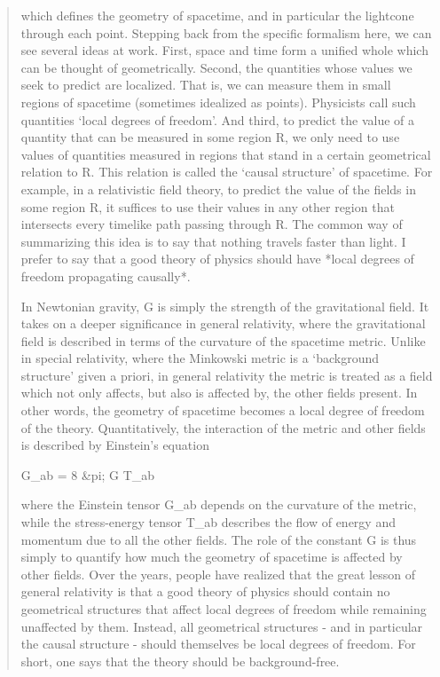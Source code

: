 \begin{quote}
which defines the geometry of spacetime, and in particular the lightcone
through each point.  Stepping back from the specific formalism here, we
can see several ideas at work.  First, space and time form a unified
whole which can be thought of geometrically.  Second, the quantities
whose values we seek to predict are localized.  That is, we can measure
them in small regions of spacetime (sometimes idealized as points).  
Physicists call such quantities `local degrees of freedom'.  And third,
to predict the value of a quantity that can be measured in some region
R, we only need to use values of quantities measured in regions that
stand in a certain geometrical relation to R.  This relation is called
the `causal structure' of spacetime.  For example, in a relativistic
field theory, to predict the value of the fields in some region R, it
suffices to use their values in any other region that intersects every
timelike path passing through R.  The common way of summarizing this
idea is to say that nothing travels faster than light.  I prefer to say
that a good theory of physics should have *local degrees of freedom
propagating causally*. 

In Newtonian gravity, G is simply the strength of the gravitational
field.  It takes on a deeper significance in general relativity, where
the gravitational field is described in terms of the curvature of the
spacetime metric.  Unlike in special relativity, where the Minkowski 
metric is a `background structure' given a priori, in general relativity
the metric is treated as a field which not only affects, but also is
affected by, the other fields present.  In other words, the geometry of
spacetime becomes a local degree of freedom of the theory.
Quantitatively, the interaction of the metric and other fields is
described by Einstein's equation

                 G_{ab} = 8 &pi; G T_{ab}

where the Einstein tensor G_{ab} depends on the curvature of the
metric, while the stress-energy tensor T_{ab} describes the flow
of energy and momentum due to all the other fields.  The role of the
constant G is thus simply to quantify how much the geometry of
spacetime is affected by other fields.   Over the years, people have
realized that the great lesson of general relativity is that a good
theory of physics should contain no geometrical structures that affect
local degrees of freedom while remaining unaffected by them.  Instead,
all geometrical structures - and in particular the causal structure -
should themselves be local degrees of freedom.  For short, one says
that the theory should be background-free.
 

\end{quote}
